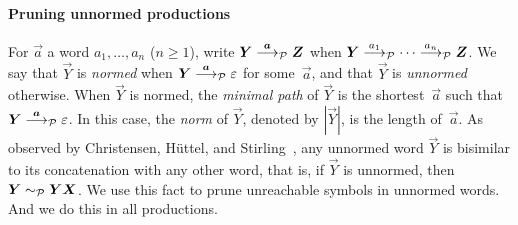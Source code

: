 \paragraph{Pruning unnormed productions}

For $\vec a$ a word $a_1,\dots, a_n$ ($n\ge1$), write
$\vec Y \LTSderivesP[\vec a] \vec Z$ when
$\vec Y \LTSderivesP[a_1] \cdots \LTSderivesP[a_n] \vec Z$.
%
We say that $\vec Y$ is \emph{normed} when
$\vec Y \LTSderivesP[\vec a] \varepsilon$ for some~$\vec a$, and that
$\vec Y$ is \emph{unnormed} otherwise.
%
When $\vec Y$ is normed, the \emph{minimal path} of $\vec Y$ is the
shortest~$\vec a$ such that $\vec Y \LTSderivesP[\vec a]
\varepsilon$.
%
In this case, the \emph{norm} of $\vec Y$, denoted by $|\vec Y|$, is
the length of~$\vec a$.
%
%
As observed by Christensen, H\"uttel, and
Stirling~\cite{DBLP:journals/iandc/ChristensenHS95}, any unnormed word
$\vec Y$ is bisimilar to its concatenation with any other word, that
is, if $\vec Y$ is unnormed, then $\vec Y \ProdEquiv \vec Y \vec X$.
We use this fact to prune unreachable symbols in unnormed words. And
we do this in all productions.




